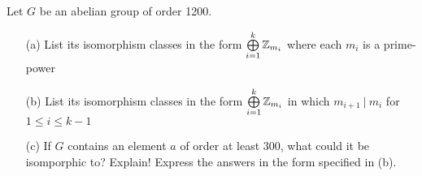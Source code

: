 \documentclass[titlepage]{article}
\begin{document}
 
\fancyhf{}
\cfoot{\thepage}

\begin{problem}{1}
Let $G$ be an abelian group of order 1200.
\begin{itemize}
\item[(a)] List its isomorphism classes in the form $\bigoplus\limits_{i=1}^k{\mathbb{Z}_{m_i}}$ where each $m_i$  is a prime-power
\item[(b)] List its isomorphism classes in the form $\bigoplus\limits_{i=1}^k{\mathbb{Z}_{m_i}}$ in which $m_{i+1} \ | \ m_i$ for $1 \leq i \leq k-1$
\item[(c)] If $G$ contains an element $a$ of order at least 300, what could it be isomporphic to? Explain! Express the answers in the form specified in (b).
\end{itemize}
\end{problem}
\end{document}
